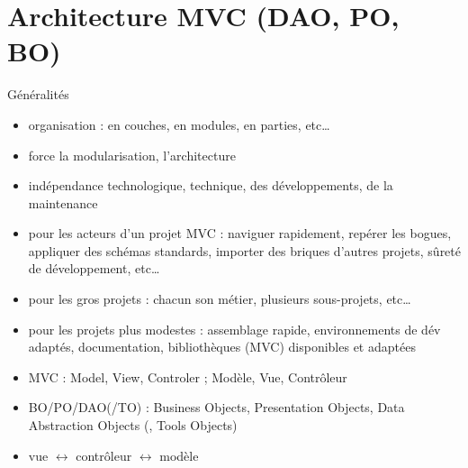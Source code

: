 
\section{Architecture MVC (DAO, PO, BO)}

\begin{frame}[containsverbatim]{Généralités}
	\begin{itemize}
		\item organisation : en couches, en modules, en parties, etc\ldots
		\item force la modularisation, l'architecture
		\item indépendance technologique, technique, des développements, de la maintenance
		\item pour les acteurs d'un projet MVC : naviguer rapidement, repérer les bogues, appliquer des schémas standards, importer des briques d'autres projets, sûreté de développement, etc\ldots
		\item pour les gros projets : chacun son métier, plusieurs sous-projets, etc\ldots
		\item pour les projets plus modestes : assemblage rapide, environnements de dév adaptés, documentation, bibliothèques (MVC) disponibles et adaptées
		\item MVC : Model, View, Controler ; Modèle, Vue, Contrôleur
		\item BO/PO/DAO(/TO) : Business Objects, Presentation Objects, Data Abstraction Objects (, Tools Objects)
		\item vue $\leftrightarrow$ contrôleur $\leftrightarrow$ modèle
	\end{itemize}
\end{frame}

